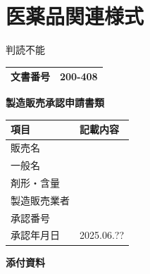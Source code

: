 \documentclass[UTF8,10pt,a4paper,fontset=fandol]{ctexart}
\newcommand{\fieldvalue}[1]{#1}
\newcommand{\handwritten}[1]{#1}
\begin{document}
\newpage

\section*{医薬品関連様式}

\fieldvalue{\handwritten{判読不能}}

\begin{tabularx}{\textwidth}{|p{}|X|}
\hline
文書番号 & 
\fieldvalue{\handwritten{200-408}} \\
\hline
\end{tabularx}

\vspace{1em}

\noindent
\textbf{製造販売承認申請書類}

\begin{tabularx}{\textwidth}{|p{}|X|}
\hline
項目 & 記載内容 \\
\hline
販売名 & \\
\hline
一般名 & \\
\hline
剤形・含量 & \\
\hline
製造販売業者 & \\
\hline
承認番号 & \\
\hline
承認年月日 &
\fieldvalue{\handwritten{2025.06.??}} \\
\hline
\end{tabularx}

\vspace{1em}

\noindent
\textbf{添付資料}
\end{document}
